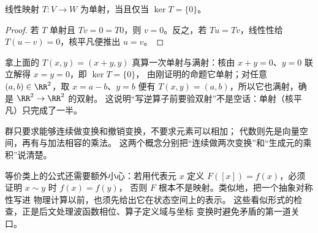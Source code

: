 \begin{proposition}[核与单射]
线性映射 \(T:V\to W\) 为单射，当且仅当 \(\ker T=\{0\}\)。
\end{proposition}
\begin{proof}
若 \(T\) 单射且 \(Tv=0=T0\)，则 \(v=0\)。反之，若 \(Tu=Tv\)，线性性给
\(T(u-v)=0\)，核平凡便推出 \(u=v\)。
\end{proof}

拿上面的 \(T(x,y)=(x+y,y)\) 真算一次单射与满射：核由
\(x+y=0\)、\(y=0\) 联立解得 \(x=y=0\)，即 \(\ker T=\{0\}\)，
由刚证明的命题它单射；对任意 \((a,b)\in\RR^2\)，取 \(x=a-b\)、\(y=b\)
便有 \(T(x,y)=(a,b)\)，所以它也满射，确是 \(\RR^2\to\RR^2\) 的双射。
这说明“写逆算子前要验双射”不是空话：单射（核平凡）只完成了一半。

群只要求能够连续做变换和撤销变换，不要求元素可以相加；
代数则先是向量空间，再有与加法相容的乘法。
这两个概念分别把“连续做两次变换”和“生成元的乘积”说清楚。

等价类上的公式还需要额外小心：若用代表元 \(x\) 定义
\(F([x])=f(x)\)，必须证明 \(x\sim y\) 时 \(f(x)=f(y)\)，
否则 \(F\) 根本不是映射。类似地，把一个抽象对称性写进
物理计算以前，也须先给出它在状态空间上的表示。
这些看似形式的检查，正是后文处理波函数相位、算子定义域与坐标
变换时避免矛盾的第一道关口。
